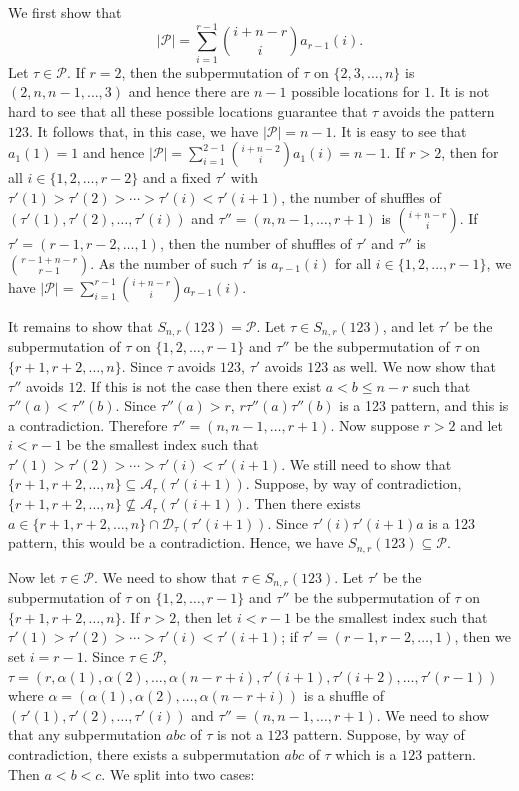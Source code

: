 \documentclass[11pt]{article}
\theoremstyle{definition}
\numberwithin{equation}{section}
\begin{document}
We first show that
\[
|\mathcal{P}|=\sum_{i=1}^{r-1}\binom{i+n-r}{i}a_{r-1}(i).
\]
Let $\tau\in\mathcal{P}$. If $r=2$, then the subpermutation of $\tau$ on $\{2,3,\ldots,n\}$ is $(2,n,n-1,\ldots,3)$ and hence there are $n-1$ possible locations for $1$. It is not hard to see that all these possible locations guarantee that $\tau$ avoids the pattern $123$. It follows that, in this case, we have $|\mathcal{P}|=n-1$. It is easy to see that $a_1(1)=1$ and hence $|\mathcal{P}|=\sum_{i=1}^{2-1}\binom{i+n-2}{i}a_1(i)=n-1$. If $r>2$, then for all $i\in\{1,2,\ldots,r-2\}$ and a fixed $\tau'$ with $\tau'(1)>\tau'(2)>\cdots>\tau'(i)<\tau'(i+1)$, the number of shuffles of $(\tau'(1),\tau'(2),\ldots,\tau'(i))$ and $\tau''=(n,n-1,\ldots,r+1)$ is $\binom{i+n-r}{i}$. If $\tau'=(r-1,r-2,\ldots,1)$, then the number of shuffles of $\tau'$ and $\tau''$ is $\binom{r-1+n-r}{r-1}$. As the number of such $\tau'$ is $a_{r-1}(i)$ for all $i\in\{1,2,\ldots,r-1\}$, we have $|\mathcal{P}|=\sum_{i=1}^{r-1}\binom{i+n-r}{i}a_{r-1}(i)$.

It remains to show that $S_{n,r}(123)=\mathcal{P}$. Let $\tau\in S_{n,r}(123)$, and let $\tau'$ be the subpermutation of 
$\tau$ on $\{1,2,\ldots,r-1\}$ and $\tau''$ be the subpermutation of 
$\tau$ on $\{r+1,r+2,\ldots,n\}$. Since $\tau$ avoids $123$, 
$\tau'$ avoids $123$ as well. We now show that $\tau''$ avoids $12$. 
If this is not the case then
there exist $a<b\leq n-r$ such that $\tau''(a)<\tau''(b)$. 
Since $\tau''(a)>r$, $r\tau''(a)\tau''(b)$ is a 123 pattern, and 
this is a contradiction. Therefore $\tau''=(n,n-1,\ldots,r+1)$. Now suppose $r>2$ and 
let $i<r-1$ be the smallest index such 
that $\tau'(1)>\tau'(2)>\cdots>\tau'(i)<\tau'(i+1)$. We still need to show that $\{r+1,r+2,\ldots,n\}\subseteq\mathcal{A}_\tau(\tau'(i+1))$. Suppose, by way of contradiction, $\{r+1,r+2,\ldots,n\}\not\subseteq\mathcal{A}_\tau(\tau'(i+1))$. Then there exists $a\in\{r+1,r+2,\ldots,n\}\cap\mathcal{D}_\tau(\tau'(i+1))$. 
Since
$\tau'(i)\tau'(i+1)a$ is a 123 pattern, this would be a contradiction. Hence, we have $S_{n,r}(123)\subseteq\mathcal{P}$.

Now let $\tau\in\mathcal{P}$. We need to show that $\tau\in S_{n,r}(123)$. Let $\tau'$ be the subpermutation of 
$\tau$ on $\{1,2,\ldots,r-1\}$ and $\tau''$ be the subpermutation of 
$\tau$ on $\{r+1,r+2,\ldots,n\}$. If $r>2$, then let $i<r-1$ be the smallest index such that $\tau'(1)>\tau'(2)>\cdots>\tau'(i)<\tau'(i+1)$; if $\tau'=(r-1,r-2,\ldots,1)$, then we set $i=r-1$. Since $\tau\in\mathcal{P}$, $\tau=(r,\alpha(1),\alpha(2),\ldots,\alpha(n-r+i),\tau'(i+1),\tau'(i+2),\ldots,\tau'(r-1))$ where $\alpha=(\alpha(1),\alpha(2),\ldots,\alpha(n-r+i))$ is a shuffle of $(\tau'(1),\tau'(2),\ldots,\tau'(i))$ and $\tau''=(n,n-1,\ldots,r+1)$. We need to show that any subpermutation $abc$ of $\tau$ is not a $123$ pattern. Suppose, by way of contradiction, there exists a subpermutation $abc$ of $\tau$ which is a $123$ pattern. Then $a<b<c$. We split into two cases:
\end{document}
